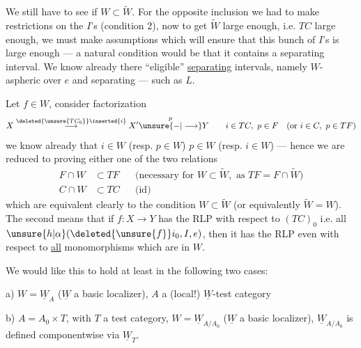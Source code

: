 
We still have to see if $W\subset\widetilde W$. For the opposite inclusion we had to make restrictions  on the $I$'s (condition 2), now to get $\widetilde W$ large enough, i.e. $TC$ large enough, we must make assumptions which will ensure that this bunch of $I$'s is large enough --- a natural condition would be that it contains a separating interval. We know already there   ``eligible'' \uline{separating} intervals, namely $W$-aspheric over $e$ and separating --- such as $L$.

Let $f\in W$, consider factorization
\[
X\overset{\deleted{\unsure{TC_0}}\inserted{i}}{\longrightarrow}X'\overset{p}{\unsure{-|\longrightarrow}}Y\qquad i\in TC,\ p\in F\quad(\text{or }i\in C,\ p\in TF)
\]
we know already that $i\in W$ (resp. $p\in W$)  $p\in W$ (resp. $i\in W$) --- hence we are reduced to  proving either one of the two relations
\[
\begin{aligned}
F\cap W&\subset TF&&\text{(necessary for }W\subset\widetilde W,\text{ as }TF=F\cap\widetilde W)\\
C\cap W&\subset TC&&\text{(id)}
\end{aligned}
\]
which are  equivalent  clearly to the condition $W\subset\widetilde W$ (or equivalently  $\widetilde W=W$). The second \inserted{[first!]} means that if $f:X\longrightarrow Y$ \inserted{[is in $W$ and]} has the  RLP with respect to $(TC)_0$ i.e. all  $\unsure{h|\alpha}(\deleted{\unsure{f}}i_0,I,e)$, then it has the RLP even with respect to \uline{all} monomorphisms which are in $W$.
\margin{[????]}

We would like this to hold at least in the following two cases:


a) $W=\underline W_A$ ($\underline W$ a basic localizer), $A$ a (local!) $\underline W$-test category

b) $A=A_0\times T$,  with $T$ a test category, $W=\underline W_{A/A_0}$ ($\underline W$ a basic localizer), $\underline W_{A/A_0}$ is defined componentwise via $\underline W_T$.

